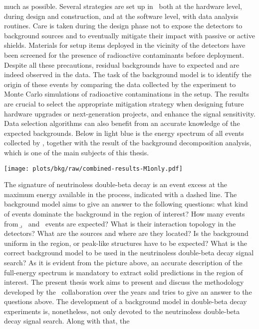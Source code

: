 much as possible. Several strategies are set up in \gerda\ both at the hardware level,
during design and construction, and at the software level, with data analysis routines.
Care is taken during the design phase not to expose the detectors to background sources
and to eventually mitigate their impact with passive or active shields. Materials for
setup items deployed in the vicinity of the detectors have been screened for the presence
of radioactive contaminants before deployment. Despite all these precautions, residual
backgrounds have to expected and are indeed observed in the data. The task of the
background model is to identify the origin of these events by comparing the data collected
by the experiment to Monte Carlo simulations of radioactive contaminations in the setup.
The results are crucial to select the appropriate mitigation strategy when designing
future hardware upgrades or next-generation projects, and enhance the signal
sensitivity. Data selection algorithms can also benefit from an accurate knowledge of the
expected backgrounds.  Below in light blue is the energy spectrum of all events collected
by \gerda, together with the result of the background decomposition analysis, which is one
of the main subjects of this thesis.
\begin{center}
  \vspace{11pt}
  \texttt{[image: plots/bkg/raw/combined-results-M1only.pdf]}
\end{center}
The signature of neutrinoless double-beta decay is an event excess at the maximum energy
available in the process, indicated with a dashed line. The background model aims to give
an answer to the following questions: what kind of events dominate the background in the
region of interest? How many events from \b, \g\ and \a\ events are expected? What is
their interaction topology in the detectors? What are the sources and where are they
located?  Is the background uniform in the region, or peak-like structures have to be
expected?  What is the correct background model to be used in the neutrinoless double-beta
decay signal search? As it is evident from the picture above, an accurate description of
the full-energy spectrum is mandatory to extract solid predictions in the region of
interest.  The present thesis work aims to present and discuss the methodology developed
by the \gerda\ collaboration over the years and tries to give an answer to the questions
above.
\newpar
The development of a background model in double-beta decay experiments is, nonetheless,
not only devoted to the neutrinoless double-beta decay signal search. Along with that, the
